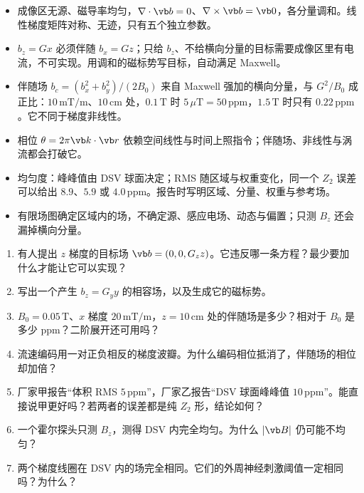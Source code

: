 \begin{takeaways}
\begin{itemize}
\item 成像区无源、磁导率均匀，$\nabla\cdot\vb b=0$、$\nabla\times\vb b=\vb 0$，各分量调和。线性梯度矩阵对称、无迹，只有五个独立参数。
\item $b_z=Gx$ 必须伴随 $b_x=Gz$；只给 $b_z$、不给横向分量的目标需要成像区里有电流，不可实现。用调和的磁标势写目标，自动满足 Maxwell。
\item 伴随场 $b_c=(b_x^2+b_y^2)/(2B_0)$ 来自 Maxwell 强加的横向分量，与 $G^2/B_0$ 成正比：$10\,\mathrm{mT/m}$、$10\,\mathrm{cm}$ 处，$0.1\,\mathrm T$ 时 $5\,\mu\mathrm T=50\,\mathrm{ppm}$，$1.5\,\mathrm T$ 时只有 $0.22\,\mathrm{ppm}$。它不同于梯度非线性。
\item 相位 $\theta=2\pi\vb k\cdot\vb r$ 依赖空间线性与时间上照指令；伴随场、非线性与涡流都会打破它。
\item 均匀度：峰峰值由 DSV 球面决定；RMS 随区域与权重变化，同一个 $Z_2$ 误差可以给出 $8.9$、$5.9$ 或 $4.0\,\mathrm{ppm}$。报告时写明区域、分量、权重与参考场。
\item 有限场图确定区域内的场，不确定源、感应电场、动态与偏置；只测 $B_z$ 还会漏掉横向分量。
\end{itemize}
\end{takeaways}

\begin{selfcheck}
\begin{enumerate}
\item 有人提出 $z$ 梯度的目标场 $\vb b=(0,0,G_zz)$。它违反哪一条方程？最少要加什么才能让它可以实现？
\item 写出一个产生 $b_z=G_yy$ 的相容场，以及生成它的磁标势。
\item $B_0=0.05\,\mathrm T$、$x$ 梯度 $20\,\mathrm{mT/m}$，$z=10\,\mathrm{cm}$ 处的伴随场是多少？相对于 $B_0$ 是多少 ppm？二阶展开还可用吗？
\item 流速编码用一对正负相反的梯度波瓣。为什么编码相位抵消了，伴随场的相位却加倍？
\item 厂家甲报告“体积 RMS $5\,\mathrm{ppm}$”，厂家乙报告“DSV 球面峰峰值 $10\,\mathrm{ppm}$”。能直接说甲更好吗？若两者的误差都是纯 $Z_2$ 形，结论如何？
\item 一个霍尔探头只测 $B_z$，测得 DSV 内完全均匀。为什么 $|\vb B|$ 仍可能不均匀？
\item 两个梯度线圈在 DSV 内的场完全相同。它们的外周神经刺激阈值一定相同吗？为什么？
\end{enumerate}
\end{selfcheck}

